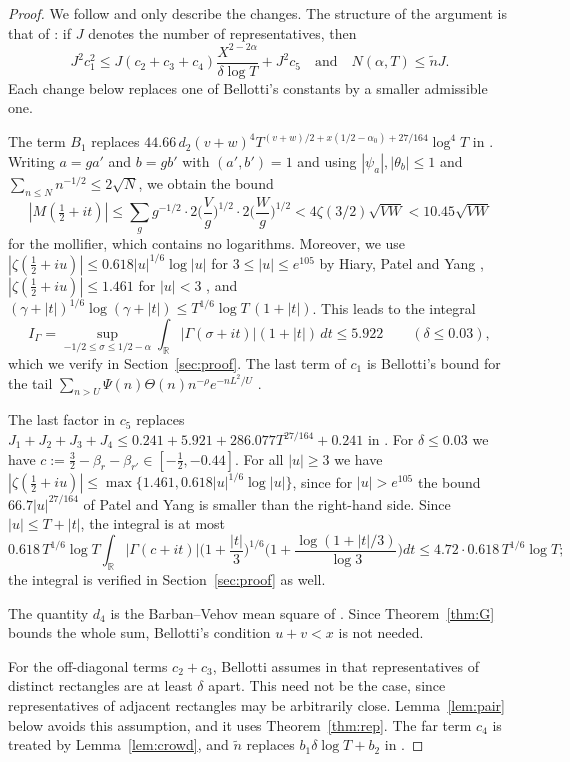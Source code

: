 \documentclass[11pt]{amsart}
\numberwithin{equation}{section}
\theoremstyle{definition}
\theoremstyle{remark}
\begin{document}
\begin{proof}
We follow \cite{Bellotti} and only describe the changes.
The structure of the argument is that of \cite[(4.22)--(4.23)]{Bellotti}: if $J$ denotes the number of representatives, then
\[
J^2c_1^2 \leq J(c_2 + c_3 + c_4)\frac{X^{2-2\alpha}}{\delta\log T} + J^2c_5 \quad\text{and}\quad N(\alpha, T) \leq \tilde nJ.
\]
Each change below replaces one of Bellotti's constants by a smaller admissible one.

The term $B_1$ replaces $44.66\,d_2(v+w)^4T^{(v+w)/2 + x(1/2 - \alpha_0) + 27/164}\log^4T$ in \cite[(3.17)]{Bellotti}.
Writing $a = ga'$ and $b = gb'$ with $(a', b') = 1$ and using $|\psi_a|, |\theta_b| \leq 1$ and $\sum_{n\leq N}n^{-1/2} \leq 2\sqrt N$, we obtain the bound
\[
|M(\tfrac12 + it)| \leq \sum_gg^{-1/2}\cdot2\Big(\frac Vg\Big)^{1/2}\cdot2\Big(\frac Wg\Big)^{1/2} < 4\zeta(3/2)\sqrt{VW} < 10.45\sqrt{VW}
\]
for the mollifier, which contains no logarithms.
Moreover, we use $|\zeta(\frac12 + iu)| \leq 0.618|u|^{1/6}\log|u|$ for $3 \leq |u| \leq e^{105}$ by Hiary, Patel and Yang \cite{HPY}, $|\zeta(\frac12 + iu)| \leq 1.461$ for $|u| < 3$ \cite{Hiary}, and $(\gamma + |t|)^{1/6}\log(\gamma + |t|) \leq T^{1/6}\log T\,(1 + |t|)$.
This leads to the integral
\[
I_\Gamma = \sup_{-1/2\leq\sigma\leq1/2-\alpha}\int_{\mathbb R}|\Gamma(\sigma + it)|(1 + |t|)\,dt \leq 5.922 \qquad (\delta \leq 0.03),
\]
which we verify in Section~\ref{sec:proof}.
The last term of $c_1$ is Bellotti's bound for the tail $\sum_{n>U}\Psi(n)\Theta(n)n^{-\rho}e^{-nL^2/U}$ \cite[(3.19)ff.]{Bellotti}.

The last factor in $c_5$ replaces $J_1 + J_2 + J_3 + J_4 \leq 0.241 + 5.921 + 286.077T^{27/164} + 0.241$ in \cite[(4.17)--(4.19)]{Bellotti}.
For $\delta \leq 0.03$ we have $c := \frac32 - \beta_r - \beta_{r'} \in [-\frac12, -0.44]$.
For all $|u| \geq 3$ we have $|\zeta(\frac12 + iu)| \leq \max\{1.461, 0.618|u|^{1/6}\log|u|\}$, since for $|u| > e^{105}$ the bound $66.7|u|^{27/164}$ of Patel and Yang \cite{PY} is smaller than the right-hand side.
Since $|u| \leq T + |t|$, the integral \cite[(4.16)]{Bellotti} is at most
\[
0.618\,T^{1/6}\log T\int_{\mathbb R}|\Gamma(c + it)|\Big(1 + \frac{|t|}3\Big)^{1/6}\Big(1 + \frac{\log(1 + |t|/3)}{\log3}\Big)dt \leq 4.72\cdot0.618\,T^{1/6}\log T;
\]
the integral is verified in Section~\ref{sec:proof} as well.

The quantity $d_4$ is the Barban--Vehov mean square of \cite[Lemma~4.2]{Bellotti}.
Since Theorem~\ref{thm:G} bounds the whole sum, Bellotti's condition $u + v < x$ is not needed.

For the off-diagonal terms $c_2 + c_3$, Bellotti assumes in \cite[(4.11)]{Bellotti} that representatives of distinct rectangles are at least $\delta$ apart.
This need not be the case, since representatives of adjacent rectangles may be arbitrarily close.
Lemma~\ref{lem:pair} below avoids this assumption, and it uses Theorem~\ref{thm:rep}.
The far term $c_4$ is treated by Lemma~\ref{lem:crowd}, and $\tilde n$ replaces $b_1\delta\log T + b_2$ in \cite[Lemma~2.4]{Bellotti}.
\end{proof}
\end{document}
